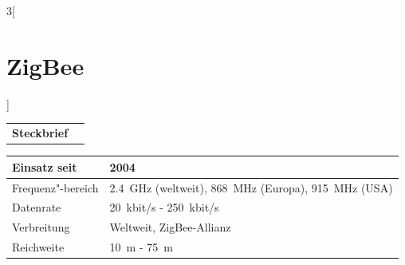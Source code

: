 \begin{multicols}{3}[\section{ZigBee}]


\newrefsegment

\begin{boxedminipage}{\linewidth}
\begin{tabular}{p{}p{2.7 cm}}
\textbf{Steckbrief}& \\
\end{tabular}
\begin{tabular}{p{}|p{2.7 cm}}
      Einsatz seit & 2004\\
      \hline
      Frequenz"-bereich  & \SI{2,4}{\giga\hertz} (weltweit), \SI{868}{\mega\hertz} (Europa), \SI{915}{\mega\hertz} (USA)  \\				
      \hline
      Datenrate & \SI{20}{kbit/s} - \SI{250}{kbit/s}\\
      \hline
      Verbreitung & Weltweit, ZigBee-Allianz\\
      \hline
      Reichweite & \SI{10}{\metre} - \SI{75}{\metre}\\
\end{tabular}
\end{boxedminipage}
\par


\end{multicols}
